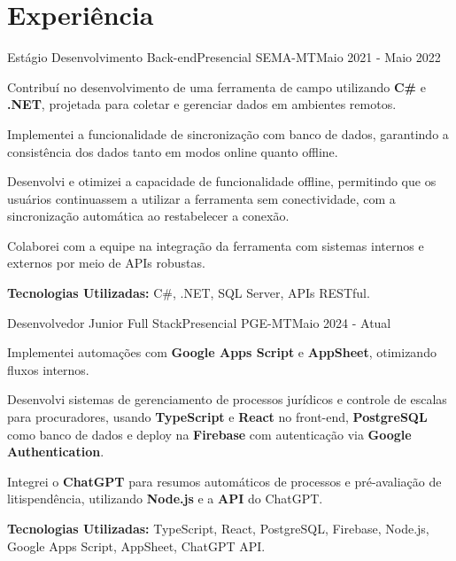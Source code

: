 \section{\textbf{Experiência}}
  \resumeSubHeadingListStart
    \resumeSubheading
      { Estágio Desenvolvimento Back-end}{Presencial}
      {SEMA-MT}{Maio 2021 - Maio 2022}
      \vspace{-2.0mm}
      \resumeItemListStart
        \item {Contribuí no desenvolvimento de uma ferramenta de campo utilizando \textbf{C\#} e \textbf{.NET}, projetada para coletar e gerenciar dados em ambientes remotos.}
        \item {Implementei a funcionalidade de sincronização com banco de dados, garantindo a consistência dos dados tanto em modos online quanto offline.}
        \item {Desenvolvi e otimizei a capacidade de funcionalidade offline, permitindo que os usuários continuassem a utilizar a ferramenta sem conectividade, com a sincronização automática ao restabelecer a conexão.}
        \item {Colaborei com a equipe na integração da ferramenta com sistemas internos e externos por meio de APIs robustas.}
        \item {\textbf{Tecnologias Utilizadas:} C\#, .NET, SQL Server, APIs RESTful.}
      \resumeItemListEnd


    \vspace{-1.0mm}
    
        \resumeSubheading
      { Desenvolvedor Junior Full Stack}{Presencial}
      {PGE-MT}{Maio 2024 - Atual}
      \vspace{-2.0mm}
      \resumeItemListStart
        \item {Implementei automações com \textbf{Google Apps Script} e \textbf{AppSheet}, otimizando fluxos internos.}
        \item {Desenvolvi sistemas de gerenciamento de processos jurídicos e controle de escalas para procuradores, usando \textbf{TypeScript} e \textbf{React} no front-end, \textbf{PostgreSQL} como banco de dados e deploy na \textbf{Firebase} com autenticação via \textbf{Google Authentication}.}
        \item {Integrei o \textbf{ChatGPT} para resumos automáticos de processos e pré-avaliação de litispendência, utilizando \textbf{Node.js} e a \textbf{API} do ChatGPT.}
        \item {\textbf{Tecnologias Utilizadas:} TypeScript, React, PostgreSQL, Firebase, Node.js, Google Apps Script, AppSheet, ChatGPT API.}
      \resumeItemListEnd

